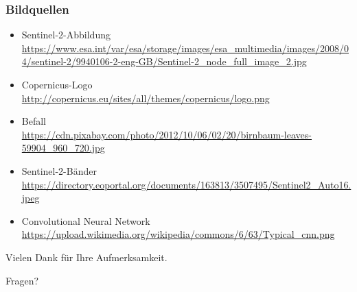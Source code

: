 \documentclass{beamer}
\begin{document}

\begin{frame}\frametitle{Bildquellen}
\begin{itemize}
\item Sentinel-2-Abbildung\\
\url{https://www.esa.int/var/esa/storage/images/esa_multimedia/images/2008/04/sentinel-2/9940106-2-eng-GB/Sentinel-2\_node\_full\_image\_2.jpg}
\item Copernicus-Logo\\
\url{http://copernicus.eu/sites/all/themes/copernicus/logo.png}
\item Befall\\
\url{https://cdn.pixabay.com/photo/2012/10/06/02/20/birnbaum-leaves-59904\_960\_720.jpg}
\item Sentinel-2-Bänder\\
\url{https://directory.eoportal.org/documents/163813/3507495/Sentinel2\_Auto16.jpeg}
\item Convolutional Neural Network\\
\url{https://upload.wikimedia.org/wikipedia/commons/6/63/Typical\_cnn.png}
\end{itemize}
\end{frame}


\begin{frame}
\centerline{Vielen Dank für Ihre Aufmerksamkeit.}
\Huge{\centerline{Fragen?}}
\end{frame}

\end{document}
